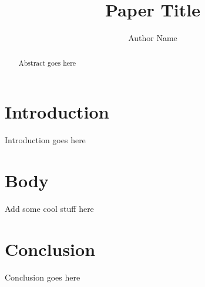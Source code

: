 \documentclass[12pt, letterpaper, titlepage]{article}
\title{Paper Title}
\author{Author Name}
\date{\displaydate{date}}
\begin{document}
\maketitle
\begin{abstract}
  Abstract goes here
\end{abstract}
\section{Introduction}
  Introduction goes here
\section{Body}
  Add some cool stuff here
\section{Conclusion}
  Conclusion goes here
\pagebreak
\printbibliography
\end{document}
